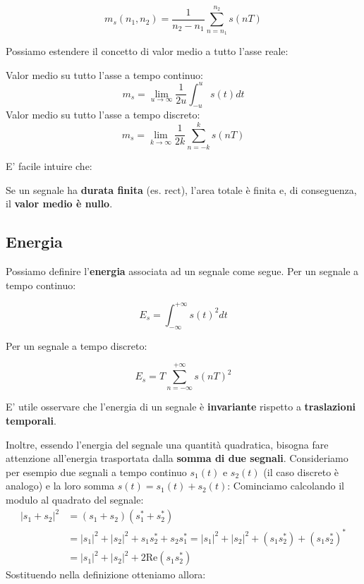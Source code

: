 \begin{definition}
    \[
        m_s(n_{1},n_{2}) = \frac{1}{n_{2}-n_{1}} \sum_{n=n_{1}}^{n_{2}} s(nT)
    \] 
\end{definition}

Possiamo estendere il concetto di valor medio a tutto l'asse reale:

\begin{prop}
    Valor medio su tutto l'asse a tempo continuo:
    \[
        m_s = \lim_{u\to\infty} \frac{1}{2u} \int_{-u}^{u} s(t)dt
    \]
    Valor medio su tutto l'asse a tempo discreto:
    \[
        m_s = \lim_{k\to\infty} \frac{1}{2k} \sum_{n=-k}^{k} s(nT)
    \] 
\end{prop}

E' facile intuire che:

\begin{remark}
    Se un segnale ha \textbf{durata finita} (es. $\text{rect}$), l'area
    totale è finita e, di conseguenza, il \textbf{valor medio è nullo}.
\end{remark}

\subsection{Energia}

Possiamo definire l'\textbf{energia} associata ad un segnale come segue.
Per un segnale a tempo continuo:

\begin{definition}
    \[
        E_s = \int_{-\infty}^{+\infty} s(t)^2 dt
    \] 
\end{definition}

Per un segnale a tempo discreto:

\begin{definition}
    \[
        E_s = T\sum_{n=-\infty}^{+\infty} s(nT)^2
    \] 
\end{definition}

E' utile osservare che l'energia di un segnale è \textbf{invariante} rispetto
a \textbf{traslazioni temporali}.

Inoltre, essendo l'energia del segnale una quantità quadratica, bisogna
fare attenzione all'energia trasportata dalla \textbf{somma di due segnali}.
Consideriamo per esempio due segnali a tempo continuo $s_{1}(t)$ e $s_{2}(t)$ 
(il caso discreto è analogo) e la loro somma $s(t)=s_{1}(t)+s_{2}(t)$:
Cominciamo calcolando il modulo al quadrato del segnale:
\[
    \begin{aligned}
        |s_{1} + s_{2}|^2 &= (s_{1}+s_{2})(s_{1}^* + s_{2}^*) \\ 
                   &= |s_{1}|^2 + |s_{2}|^2 + s_{1}s_{2}^* + s_{2}s_{1}^* 
                   =  |s_{1}|^2 + |s_{2}|^2 + (s_{1}s_{2}^*) + (s_{1}s_{2}^*)^* \\ 
                   &= |s_{1}|^2 + |s_{2}|^2 + 2 \text{Re}(s_{1}s_{2}^*)
    \end{aligned}
\]
Sostituendo nella definizione otteniamo allora:

